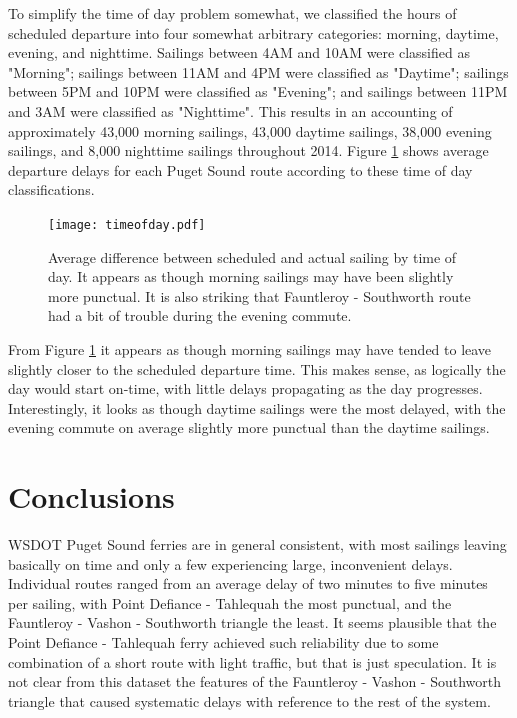 \documentclass[11pt, letterpaper]{article}
\begin{document}
To simplify the time of day problem somewhat, we classified the hours of scheduled departure into four somewhat arbitrary categories: morning, daytime, evening, and nighttime. Sailings between 4AM and 10AM were classified as "Morning"; sailings between 11AM and 4PM were classified as "Daytime"; sailings between 5PM and 10PM were classified as "Evening"; and sailings between 11PM and 3AM were classified as "Nighttime". This results in an accounting of approximately 43,000 morning sailings, 43,000 daytime sailings, 38,000 evening sailings, and 8,000 nighttime sailings throughout 2014. Figure \ref{timeofday} shows average departure delays for each Puget Sound route according to these time of day classifications.

\begin{figure}[htbp]
\begin{center}
\texttt{[image: timeofday.pdf]}
\caption{Average difference between scheduled and actual sailing by time of day. It appears as though morning sailings may have been slightly more punctual. It is also striking that Fauntleroy - Southworth route had a bit of trouble during the evening commute.}
\label{timeofday}
\end{center}
\end{figure}

From Figure \ref{timeofday} it appears as though morning sailings may have tended to leave slightly closer to the scheduled departure time. This makes sense, as logically the day would start on-time, with little delays propagating as the day progresses. Interestingly, it looks as though daytime sailings were the most delayed, with the evening commute on average slightly more punctual than the daytime sailings.


\section*{Conclusions}

WSDOT Puget Sound ferries are in general consistent, with most sailings leaving basically on time and only a few experiencing large, inconvenient delays. Individual routes ranged from an average delay of two minutes to five minutes per sailing, with Point Defiance - Tahlequah the most punctual, and the Fauntleroy - Vashon - Southworth triangle the least. It seems plausible that the Point Defiance - Tahlequah ferry achieved such reliability due to some combination of a short route with light traffic, but that is just speculation. It is not clear from this dataset the features of the Fauntleroy - Vashon - Southworth triangle that caused systematic delays with reference to the rest of the system.
\end{document}
